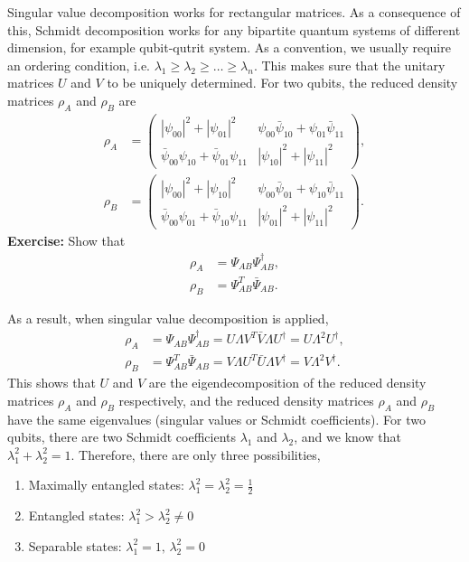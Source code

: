 \documentclass{beamer}
\begin{document}
\begin{frame}
\justify
Singular value decomposition works for rectangular matrices. As a consequence of this, Schmidt decomposition works for any bipartite quantum systems of different dimension, for example qubit-qutrit system.
\vfill
As a convention, we usually require an ordering condition, i.e. $\lambda_1 \geq \lambda_2 \geq \ldots \geq \lambda_n$. This makes sure that the unitary matrices $U$ and $V$ to be uniquely determined.
\vfill
For two qubits, the reduced density matrices $\rho_A$ and $\rho_B$ are
\begin{align}
\rho_A & = \begin{pmatrix} |\psi_{00}|^2 + |\psi_{01}|^2 & \psi_{00} \bar{\psi}_{10} + \psi_{01} \bar{\psi}_{11} \\ \bar{\psi}_{00} \psi_{10} + \bar{\psi}_{01} \psi_{11} & |\psi_{10}|^2 + |\psi_{11}|^2 \end{pmatrix}, \\
\rho_B & = \begin{pmatrix} |\psi_{00}|^2 + |\psi_{10}|^2 & \psi_{00} \bar{\psi}_{01} + \psi_{10} \bar{\psi}_{11} \\ \bar{\psi}_{00} \psi_{01} + \bar{\psi}_{10} \psi_{11} & |\psi_{01}|^2 + |\psi_{11}|^2 \end{pmatrix}.
\end{align}
\vfill
\textbf{Exercise:} Show that
\begin{align}
\rho_A & = \Psi_{AB} \Psi_{AB}^\dagger, \\
\rho_B & = \Psi_{AB}^T \bar{\Psi}_{AB}.
\end{align}
\end{frame}

\begin{frame}
\justify
As a result, when singular value decomposition is applied,
\begin{align}
\rho_A & = \Psi_{AB} \Psi_{AB}^\dagger = U \Lambda V^T \bar{V} \Lambda U^\dagger = U \Lambda^2 U^\dagger, \\
\rho_B & = \Psi_{AB}^T \bar{\Psi}_{AB} = V \Lambda U^T \bar{U} \Lambda V^\dagger = V \Lambda^2 V^\dagger.
\end{align}
\vfill
This shows that $U$ and $V$ are the eigendecomposition of the reduced density matrices $\rho_A$ and $\rho_B$ respectively, and the reduced density matrices $\rho_A$ and $\rho_B$ have the same eigenvalues (singular values or Schmidt coefficients).
\vfill
For two qubits, there are two Schmidt coefficients $\lambda_1$ and $\lambda_2$, and we know that $\lambda_1^2 + \lambda_2^2 = 1$. Therefore, there are only three possibilities,
\begin{enumerate}
\item Maximally entangled states: $\lambda_1^2 = \lambda_2^2 = \frac{1}{2}$
\item Entangled states: $\lambda_1^2 > \lambda_2^2 \neq 0$
\item Separable states: $\lambda_1^2 = 1,\, \lambda_2^2 = 0$
\end{enumerate}
\end{frame}
\end{document}
